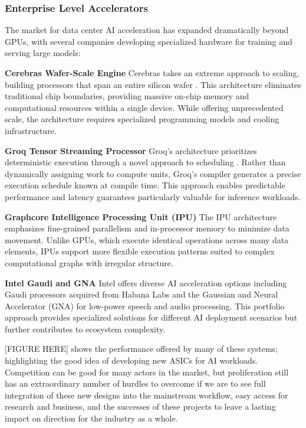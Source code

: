 \documentclass[manuscript,screen,review,format=acmsmall]{acmart}
\begin{document}
\subsubsection{Enterprise Level Accelerators}

The market for data center AI acceleration has expanded dramatically beyond GPUs, with several companies developing specialized hardware for training and serving large models:

\textbf{Cerebras Wafer-Scale Engine} Cerebras takes an extreme approach to scaling, building processors that span an entire silicon wafer \cite{LieSean2023CADD}. This architecture eliminates traditional chip boundaries, providing massive on-chip memory and computational resources within a single device. While offering unprecedented scale, the architecture requires specialized programming models and cooling infrastructure.

\textbf{Groq Tensor Streaming Processor} Groq's architecture prioritizes deterministic execution through a novel approach to scheduling \cite{Groq}. Rather than dynamically assigning work to compute units, Groq's compiler generates a precise execution schedule known at compile time. This approach enables predictable performance and latency guarantees particularly valuable for inference workloads.

\textbf{Graphcore Intelligence Processing Unit (IPU)} The IPU architecture emphasizes fine-grained parallelism and in-processor memory to minimize data movement. Unlike GPUs, which execute identical operations across many data elements, IPUs support more flexible execution patterns suited to complex computational graphs with irregular structure.

\textbf{Intel Gaudi and GNA} Intel offers diverse AI acceleration options including Gaudi processors acquired from Habana Labs and the Gaussian and Neural Accelerator (GNA) for low-power speech and audio processing. This portfolio approach provides specialized solutions for different AI deployment scenarios but further contributes to ecosystem complexity.

[FIGURE HERE] shows the performance offered by many of these systems; highlighting the good idea of developing new ASICs for AI workloads. Competition can be good for many actors in the market, but proliferation still has an extraordinary number of hurdles to overcome if we are to see full integration of these new designs into the mainstream workflow, easy access for research and business, and the successes of these projects to leave a lasting impact on direction for the industry as a whole.
\end{document}
